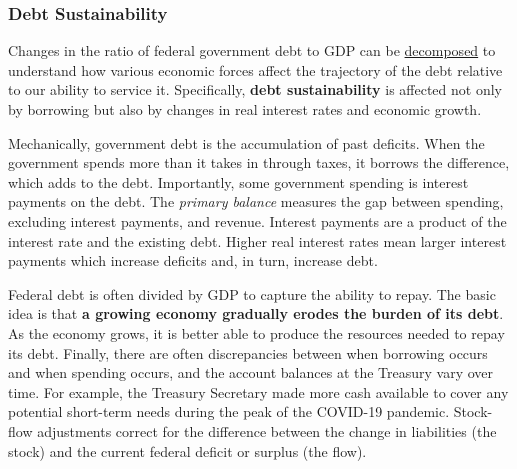 \subsubsection*{Debt Sustainability}
\begin{minipage}{0.76\textwidth}   
\small Changes in the ratio of federal government debt to GDP can be \href{https://www.imf.org/en/Publications/TNM/Issues/2016/12/31/A-Practical-Guide-to-Public-Debt-Dynamics-Fiscal-Sustainability-and-Cyclical-Adjustment-of-23498}{decomposed} to understand how various economic forces affect the trajectory of the debt relative to our ability to service it. Specifically, \textbf{debt sustainability} is affected not only by borrowing but also by changes in real interest rates and economic growth. 

Mechanically, government debt is the accumulation of past deficits. When the government spends more than it takes in through taxes, it borrows the difference, which adds to the debt. Importantly, some government spending is interest payments on the debt. The \textit{primary balance} measures the gap between spending, excluding interest payments, and revenue. Interest payments are a product of the interest rate and the existing debt. Higher real interest rates mean larger interest payments which increase deficits and, in turn, increase debt.

Federal debt is often divided by GDP to capture the ability to repay. The basic idea is that \textbf{a growing economy gradually erodes the burden of its debt}. As the economy grows, it is better able to produce the resources needed to repay its debt. Finally, there are often discrepancies between when borrowing occurs and when spending occurs, and the account balances at the Treasury vary over time. For example, the Treasury Secretary made more cash available to cover any potential short-term needs during the peak of the COVID-19 pandemic. Stock-flow adjustments correct for the difference between the change in liabilities (the stock) and the current federal deficit or surplus (the flow).


\vspace{2mm}

\vspace{6.0cm}


\end{minipage}
